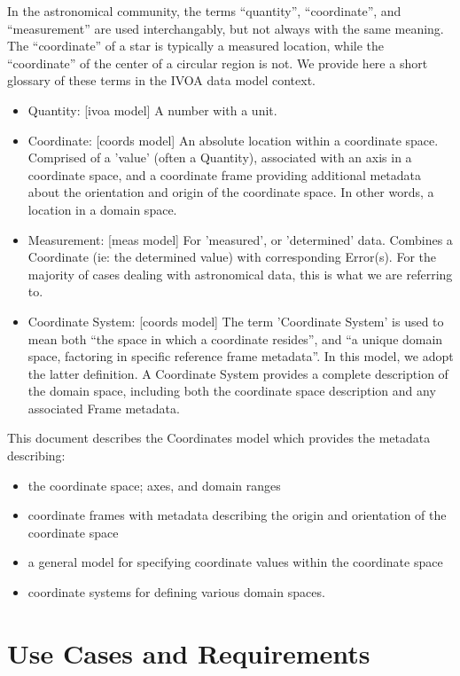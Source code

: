 \documentclass[11pt,a4paper]{ivoa}
\begin{document}
In the astronomical community, the terms ``quantity'', ``coordinate'', and ``measurement'' are used interchangably, but not always 
with the same meaning.  The ``coordinate'' of a star is typically a measured location, while the ``coordinate'' of the center
of a circular region is not.  We provide here a short glossary of these terms in the IVOA data model context.
\begin{itemize}
  \item Quantity: [ivoa model]  A number with a unit.
  \item Coordinate: [coords model]  An absolute location within a coordinate space.  Comprised of a 'value' (often a Quantity), 
associated with an axis in a coordinate space, and a coordinate frame providing additional metadata about the orientation and origin of the coordinate space.
In other words, a location in a domain space.
  \item Measurement: [meas model]  For 'measured', or 'determined' data.  Combines a Coordinate (ie: the determined value) with 
corresponding Error(s).  For the majority of cases dealing with astronomical data, this is what we are referring to.
  \item Coordinate System: [coords model]  The term 'Coordinate System' is used to mean both ``the space in which a coordinate resides'', and ``a unique domain space, factoring in specific reference frame metadata''.  In this model, we adopt the latter definition.  A Coordinate System provides a complete description of the domain space, including both the coordinate space description and any associated Frame metadata.
\end{itemize}

\noindent This document describes the Coordinates model which provides the metadata describing:
\begin{itemize}
\item the coordinate space; axes, and domain ranges
\item coordinate frames with metadata describing the origin and orientation of the coordinate space
\item a general model for specifying coordinate values within the coordinate space
\item coordinate systems for defining various domain spaces.
\end{itemize}

\section{Use Cases and Requirements}
\label{sect:ucreq}
\end{document}
